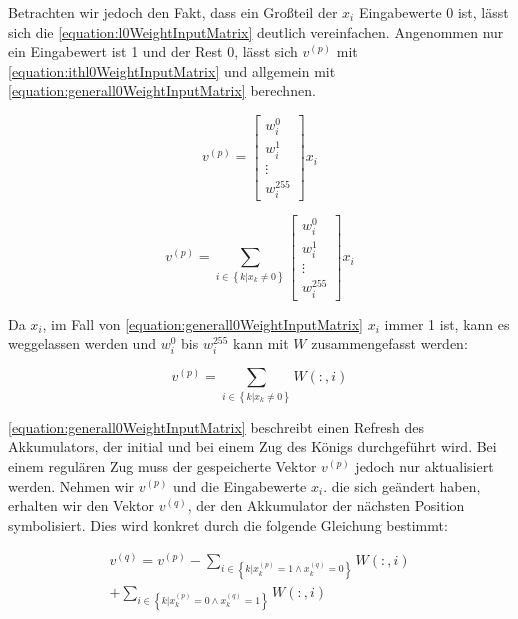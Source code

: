 Betrachten wir jedoch den Fakt, dass ein Großteil der $x_{i}$ Eingabewerte 0 ist, lässt sich die \autoref{equation:l0WeightInputMatrix} deutlich vereinfachen. Angenommen nur ein Eingabewert ist 1 und der Rest 0, lässt sich $v^{(p)}$ mit \autoref{equation:ithl0WeightInputMatrix} und allgemein mit \autoref{equation:generall0WeightInputMatrix} berechnen.

\begin{equation}
  v^{(p)}=\begin{bmatrix}
    w_{i}^{0} \\
    w_{i}^{1} \\
    \vdots    \\
    w_{i}^{255}
  \end{bmatrix} x_{i}
  \label{equation:ithl0WeightInputMatrix}
\end{equation}

\begin{equation}
  v^{(p)}= \sum_{i\in\left \{  k|x_{k}\neq 0\right \}} \begin{bmatrix}
    w_{i}^{0} \\
    w_{i}^{1} \\
    \vdots    \\
    w_{i}^{255}
  \end{bmatrix} x_{i}
  \label{equation:generall0WeightInputMatrix}
\end{equation}

Da $x_{i}$, im Fall von \autoref{equation:generall0WeightInputMatrix} $x_{i}$ immer 1 ist, kann es weggelassen werden und $w_{i}^{0}$ bis $w_{i}^{255}$ kann mit $W$ zusammengefasst werden:

\begin{equation}
  v^{(p)}= \sum_{i\in\left \{  k|x_{k}\neq 0\right \}} W(:,i)
  \label{equation:generall0WeightInputMatrixNoX}
\end{equation}

\autoref{equation:generall0WeightInputMatrix} beschreibt einen Refresh des Akkumulators, der initial und bei einem Zug des Königs durchgeführt wird. Bei einem regulären Zug muss der gespeicherte Vektor $v^{(p)}$ jedoch nur aktualisiert werden. Nehmen wir $v^{(p)}$ und die Eingabewerte $x_{i}$. die sich geändert haben, erhalten wir den Vektor $v^{(q)}$, der den Akkumulator der nächsten Position symbolisiert. Dies wird konkret durch die folgende Gleichung bestimmt:

\begin{equation}
  \begin{split}
    v^{(q)} = v^{(p)}
    - \sum_{i \in \left \{ k | x_{k}^{(p)}=1\wedge x_{k}^{(q)}=0 \right \}}^{} W(:,i) \\
    + \sum_{i \in \left \{ k | x_{k}^{(p)}=0\wedge x_{k}^{(q)}=1 \right \}}^{} W(:,i)
  \end{split}
  \label{equation:akkumulatoreAktualisierung}
\end{equation}

